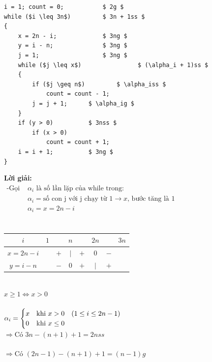 \documentclass[12pt, letterpaper]{article}
\begin{document}
\begin{lstlisting}
i = 1; count = 0;      		$ 2g $
while ($i \leq 3n$)         $ 3n + 1ss $	
{
    x = 2n - i;        		$ 3ng $
    y = i - n;         		$ 3ng $
    j = 1;             		$ 3ng $
    while ($j \leq x$)        	      $ (\alpha_i + 1)ss $ 
    {
    	if ($j \geq n$)			$ \alpha_iss $
    	    count = count - 1;
        j = j + 1;		$ \alpha_ig $
    }
    if (y > 0)			$ 3nss $
        if (x > 0)
            count = count + 1;
    i = i + 1;			$ 3ng $
}
\end{lstlisting}
\textbf{Lời giải:} \\
$ \begin{aligned}
	\text{-Gọi } & \alpha_i \text{ là số lần lặp của while trong:}                              \\
				& \alpha_i = \text{số con j với j chạy từ 1} \rightarrow x \text{, bước tăng là 1} \\
				& \alpha_i = x = 2n - i \\
\end{aligned} $ \\
 \\
\begin{table}[htb]
    \begin{tabular}{c|c c c c c c c}
        $i$ & $1$ &  & $n$ &  & $2n$ &  & $3n$ \\
        \hline
        $x = 2n - i$ &  & $+$ & $\vert$ & $+$ & $0$ & $-$ & \\
        $y = i - n$ &  & $-$ & $0$ & $+$ & $\vert$ & $+$ &  \\
    \end{tabular}
\end{table} \\
 $x \geq 1 \Leftrightarrow x > 0$ \\ \\
$\alpha_i =
\begin{cases}
x &\text{khi } x>0 \quad (1 \leq i \leq 2n - 1)\\
0 &\text{khi } x\leq 0
\end{cases} \\$
 \\
$\Rightarrow \text{Có } 3n - (n + 1) + 1 = 2nss$ \\
 \\
$\Rightarrow \text{Có } (2n - 1) - (n + 1) + 1 = (n - 1)g$ \\
\end{document}
